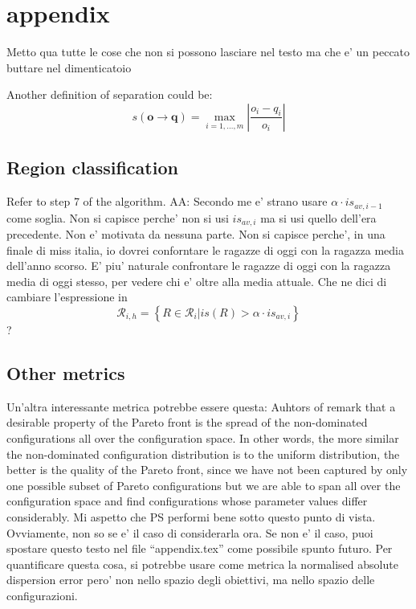 \section{appendix}
Metto qua tutte le cose che non si possono lasciare nel testo ma che e' un peccato buttare nel dimenticatoio

\begin{definition} Another definition of separation could be:
	\[
	s\left(\mathbf{o}\rightarrow\mathbf{q}\right)=\max_{i=1,\dots,m}\left|\frac{o_{i}-q_{i}}{o_{i}}\right|
	\]
\end{definition}



\subsection{Region classification}
Refer to step 7 of the algorithm.
AA: Secondo me e' strano usare $\alpha\cdot is_{av,i-1}$ come soglia. Non si capisce perche' non si usi $is_{av,i}$ ma si usi quello dell'era precedente. Non e' motivata da nessuna parte. Non si capisce perche', in una finale di miss italia, io dovrei conforntare le ragazze di oggi con la ragazza media dell'anno scorso. E' piu' naturale confrontare le ragazze di oggi con la ragazza media di oggi stesso, per vedere chi e' oltre alla media attuale. Che ne dici di cambiare l'espressione in 
			\[
			\mathcal{R}_{i,h}=\left\{ \left.R\in\mathcal{R}_{i}\right|is\left(R\right)>\alpha\cdot is_{av,i}\right\} 
			\]
?

\subsection{Other metrics}
Un'altra interessante metrica potrebbe essere questa: Auhtors of \cite{zitzler_ec00} remark that a desirable property of the Pareto front is the spread of the non-dominated configurations all over the configuration space. In other words, the more similar the non-dominated configuration distribution is to the uniform distribution, the better is the quality of the Pareto front, since we have not been captured by only one possible subset of Pareto configurations but we are able to span all over the configuration space and find configurations whose parameter values differ considerably. Mi aspetto che PS performi bene sotto questo punto di vista. Ovviamente, non so se e' il caso di considerarla ora. Se non e' il caso, puoi spostare questo testo nel file ``appendix.tex'' come possibile spunto futuro. Per quantificare questa cosa, si potrebbe usare come metrica la normalised absolute dispersion error pero' non nello spazio degli obiettivi, ma nello spazio delle configurazioni.

